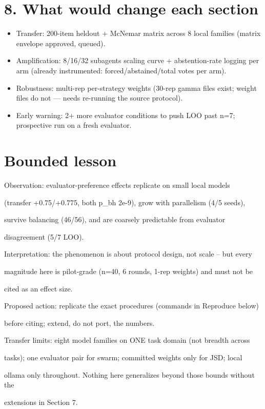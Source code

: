 \documentclass[11pt]{article}
\begin{document}
\section*{8. What would change each section}

\begin{itemize}
\item Transfer: 200-item heldout + McNemar matrix across 8 local families (matrix envelope approved, queued).
\item Amplification: 8/16/32 subagents scaling curve + abstention-rate logging per arm (already instrumented: forced/abstained/total votes per arm).
\item Robustness: multi-rep per-strategy weights (30-rep gamma files exist; weight files do not --- needs re-running the source protocol).
\item Early warning: 2+ more evaluator conditions to push LOO past n=7; prospective run on a fresh evaluator.
\end{itemize}

\section*{Bounded lesson}

Observation: evaluator-preference effects replicate on small local models

(transfer +0.75/+0.775, both p\_bh 2e-9), grow with parallelism (4/5 seeds),

survive balancing (46/56), and are coarsely predictable from evaluator

disagreement (5/7 LOO).

Interpretation: the phenomenon is about protocol design, not scale -- but every

magnitude here is pilot-grade (n=40, 6 rounds, 1-rep weights) and must not be

cited as an effect size.

Proposed action: replicate the exact procedures (commands in Reproduce below)

before citing; extend, do not port, the numbers.

Transfer limits: eight model families on ONE task domain (not breadth across

tasks); one evaluator pair for swarm; committed weights only for JSD; local

ollama only throughout. Nothing here generalizes beyond those bounds without the

extensions in Section 7.
\end{document}
